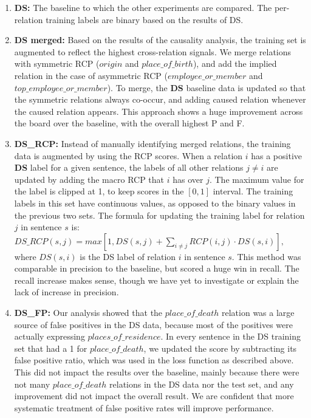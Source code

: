 \begin{enumerate}

\item \textbf{DS:} The baseline to which the other experiments are compared. The per-relation training labels are binary based on the results of DS.

\item \textbf{DS merged:} Based on the results of the causality analysis, the training set is augmented to reflect the highest cross-relation signals.  We merge relations with symmetric RCP ($origin$ and $place\_of\_birth$), and add the implied relation in the case of asymmetric RCP ($employee\_or\_member$  and $top\_employee\_or\_member$). To merge, the \textbf{DS} baseline data is updated so that the symmetric relations always co-occur, and adding caused relation whenever the caused relation appears. This approach shows a huge improvement across the board over the baseline, with the overall highest P and F.

\item \textbf{DS\_RCP:} Instead of manually identifying merged relations, the training data is augmented by using the RCP scores. When a relation $i$ has a positive \textbf{DS} label for a given sentence, the labels of all other relations $j \neq i$ are updated by adding the macro RCP that $i$ has over $j$. The maximum value for the label is clipped at 1, to keep scores in the $[0,1]$ interval. The training labels in this set have continuous values, as opposed to the binary values in the previous two sets. The formula for updating the training label for relation $j$ in sentence $s$ is: $ DS\_RCP(s, j) = max[1, DS(s, j) + \sum_{i \neq j} RCP(i,j) \cdot DS(s,i) ],$ where $DS(s,i)$ is the DS label of relation $i$ in sentence $s$.  This method was comparable in precision to the baseline, but scored a huge win in recall.  The recall increase makes sense, though we have yet to investigate or explain the lack of increase in precision.

\item \textbf{DS\_FP:} Our analysis showed that the $place\_of\_death$ relation was a large source of false positives in the DS data, because most of the positives were actually expressing $places\_of\_residence$.  In every sentence in the DS training set that had a 1 for $place\_of\_death$, we updated the score by subtracting its false positive ratio, which was used in the loss function as described above.  This did not impact the results over the baseline, mainly because there were not many $place\_of\_death$ relations in the DS data nor the test set, and any improvement did not impact the overall result.  We are confident that more systematic treatment of false positive rates will improve performance.

\end{enumerate}

